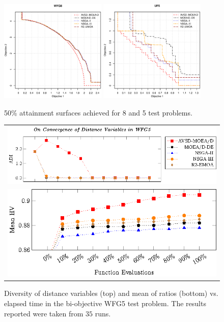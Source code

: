 \begin{figure}[t]
\centering
\includegraphics[width=0.45\textwidth]{images/WFG8_2.eps} 
\includegraphics[width=0.45\textwidth]{images/UF5_2.eps}
\caption{50\% attainment surfaces achieved for \WFG{}8 and \UF{}5 test problems.}\label{fig:attainment}
\end{figure}


\begin{figure}[t]
\centering
\begin{tabular}{l}
 \includegraphics[scale=1.15]{images/Diversity_Long_Term_tikz_WFG5-figure0.eps}\\[0cm]%
 \hspace*{-0.1cm}\includegraphics[scale=1.15]{images/Diversity_Long_Term_tikz_WFG5-figure1.eps}\\[0cm]%
\end{tabular}
\caption{Diversity of distance variables (top) and mean of \HV{} ratios (bottom) vs. elapsed time in the bi-objective WFG5 test problem. The results reported were taken from $35$ runs.}\label{fig:WFG5_Diversity}
\end{figure}


